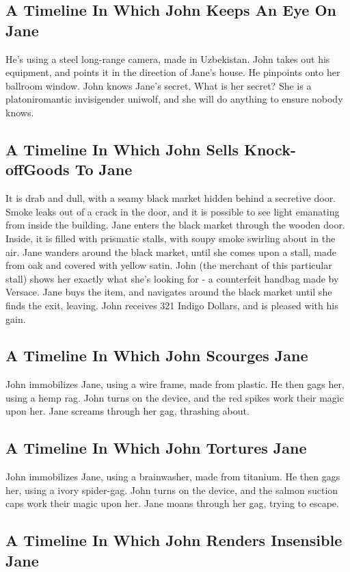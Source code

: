 \documentclass{article}
\begin{document}
\subsection{A Timeline In Which John Keeps An Eye On Jane}


He's using a steel long{-}range camera, made in Uzbekistan.
John takes out his equipment, and points it in the direction of Jane's house. He pinpoints onto her ballroom window.
John knows Jane's secret. What is her secret? She is a platoniromantic invisigender uniwolf, and she will do anything to ensure nobody knows.
\subsection{A Timeline In Which John Sells Knock{-}offGoods To Jane}


It is drab and dull, with a seamy black market hidden behind a secretive door.
Smoke leaks out of a crack in the door, and it is possible to see light emanating from inside the building.
Jane enters the black market through the wooden door.
Inside, it is filled with prismatic stalls, with soupy smoke swirling about in the air.
Jane wanders around the black market, until she comes upon a stall, made from oak and covered with yellow satin.
John (the merchant of this particular stall) shows her exactly what she's looking for {-} a counterfeit handbag made by Versace.
Jane buys the item, and navigates around the black market until she finds the exit, leaving.
John receives 321 Indigo Dollars, and is pleased with his gain.
\subsection{A Timeline In Which John Scourges Jane}


John immobilizes Jane, using a wire frame, made from plastic.
He then gags her, using a hemp rag.
John turns on the device, and the red spikes work their magic upon her.
Jane screams through her gag, thrashing about.
\subsection{A Timeline In Which John Tortures Jane}


John immobilizes Jane, using a brainwasher, made from titanium.
He then gags her, using a ivory spider{-}gag.
John turns on the device, and the salmon suction caps work their magic upon her.
Jane moans through her gag, trying to escape.
\subsection{A Timeline In Which John Renders Insensible Jane}
\end{document}
